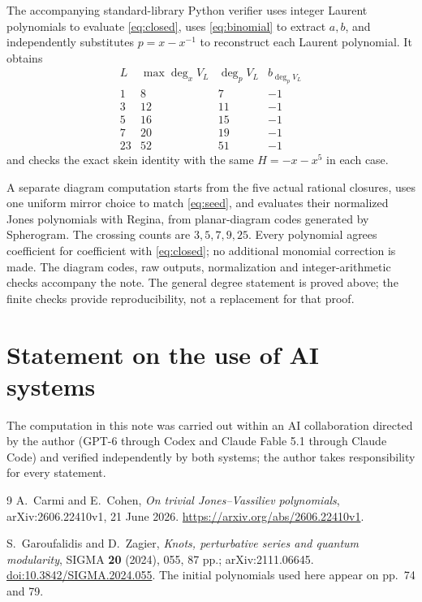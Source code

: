 \documentclass[11pt]{amsart}
\theoremstyle{remark}
\newcommand{\degp}{\deg_p}
\begin{document}
The accompanying standard-library Python
verifier uses integer Laurent polynomials
to evaluate \eqref{eq:closed}, uses
\eqref{eq:binomial} to extract \(a,b\),
and independently substitutes
\(p=x-x^{-1}\) to reconstruct each
Laurent polynomial. It obtains
\[
\begin{array}{c|r|r|r}
 L&\max\deg_x V_L&\degp V_L&b_{\degp V_L}\\ \hline
 1&8&7&-1\\
 3&12&11&-1\\
 5&16&15&-1\\
 7&20&19&-1\\
 23&52&51&-1
\end{array}
\]
and checks the exact skein identity with
the same \(H=-x-x^5\) in each case.

A separate diagram computation starts
from the five actual rational closures,
uses one uniform mirror choice to match
\eqref{eq:seed}, and evaluates their
normalized Jones polynomials with
Regina, from planar-diagram codes
generated by Spherogram.
The crossing counts are \(3,5,7,9,25\).
Every polynomial agrees coefficient
for coefficient with \eqref{eq:closed};
no additional monomial correction is
made. The diagram codes, raw outputs,
normalization and integer-arithmetic
checks accompany the note.
The general degree statement is proved
above; the finite checks provide
reproducibility, not a replacement
for that proof.

\section*{Statement on the use of AI systems}
The computation in this note was carried out within an AI collaboration directed by the author (GPT-6 through Codex and Claude Fable 5.1 through Claude Code) and verified independently by both systems; the author takes responsibility for every statement.

\begin{thebibliography}{9}
A.~Carmi and E.~Cohen,
\emph{On trivial Jones--Vassiliev polynomials},
arXiv:2606.22410v1, 21 June 2026.
\url{https://arxiv.org/abs/2606.22410v1}.

S.~Garoufalidis and D.~Zagier,
\emph{Knots, perturbative series and quantum modularity},
SIGMA \textbf{20} (2024), 055, 87 pp.;
arXiv:2111.06645.
\href{https://doi.org/10.3842/SIGMA.2024.055}{doi:10.3842/SIGMA.2024.055}.
The initial polynomials used here appear on pp.~74 and 79.
\end{thebibliography}
\end{document}
